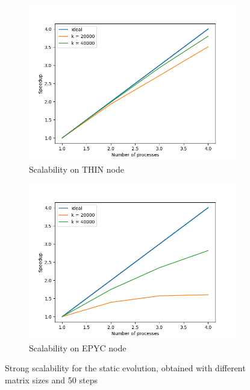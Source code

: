 \documentclass[12pt]{article}
\begin{document}
    \begin{figure}[h]
    \centering
    \begin{subfigure}[b]{0.4\textwidth}
        \includegraphics[width = \textwidth]{figs1/Strong_scal_THIN.png}
        \caption{Scalability on THIN node}
        \label{fig:strong_s_thin}
    \end{subfigure}
    \begin{subfigure}[b]{0.4\textwidth}
        \includegraphics[width = \textwidth]{figs1/Strong_scal_EPYC.png}
        \caption{Scalability on EPYC node}
        \label{fig:strong_s_epyc}
    \end{subfigure}
    \caption{Strong scalability for the static evolution, obtained with different matrix sizes and 50 steps}
    \label{fig:strong_static}
    \end{figure}
    
\end{document}
